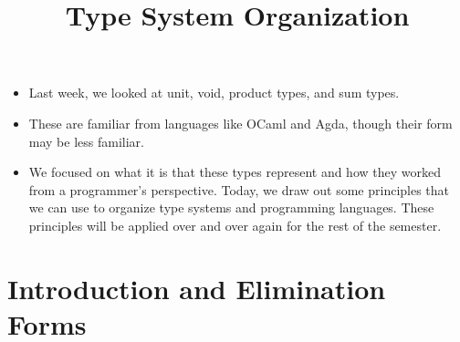 \documentclass{lecturenotes}
\title{Type System Organization}
\newcommand{\utype}{\textsf{unit}\xspace}
\newcommand{\vtype}{\textsf{void}\xspace}
\begin{document}
\maketitle

\begin{itemize}
\item Last week, we looked at \utype, \vtype, product types, and sum types.
\item These are familiar from languages like OCaml and Agda, though their form may be less familiar.
\item We focused on what it is that these types represent and how they worked from a programmer's perspective.
  Today, we draw out some principles that we can use to organize type systems and programming languages.
  These principles will be applied over and over again for the rest of the semester.
\end{itemize}

\section{Introduction and Elimination Forms}
\label{sec:intr-elim-forms}
\end{document}
